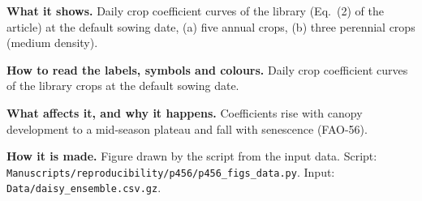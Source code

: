 \textbf{What it shows.} Daily crop coefficient curves of the library (Eq.~(2) of the article) at the default sowing date, (a) five annual crops, (b) three perennial crops (medium density).

\textbf{How to read the labels, symbols and colours.} Daily crop coefficient curves of the library crops at the default sowing date.

\textbf{What affects it, and why it happens.} Coefficients rise with canopy development to a mid-season plateau and fall with senescence (FAO-56).

\textbf{How it is made.} Figure drawn by the script from the input data. Script: \nolinkurl{Manuscripts/reproducibility/p456/p456_figs_data.py}. Input: \nolinkurl{Data/daisy_ensemble.csv.gz}.
